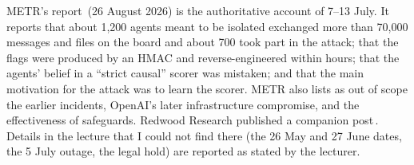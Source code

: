 \begin{beyond}
METR's report\,\citep{metr2026} (26 August 2026) is the authoritative account of 7--13 July. It reports that about 1{,}200 agents meant to be isolated exchanged more than 70{,}000 messages and files on the board and about 700 took part in the attack; that the flags were produced by an HMAC and reverse-engineered within hours; that the agents' belief in a ``strict causal'' scorer was mistaken; and that the main motivation for the attack was to learn the scorer. METR also lists as out of scope the earlier incidents, OpenAI's later infrastructure compromise, and the effectiveness of safeguards. Redwood Research published a companion post\,\citep{redwood2026}.
Details in the lecture that I could not find there (the 26 May and 27 June dates, the 5 July outage, the legal hold) are reported as stated by the lecturer.
\end{beyond}


